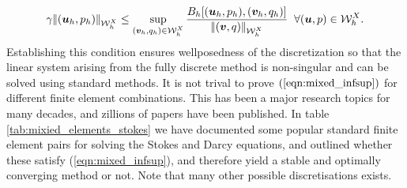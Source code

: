 \begin{equation}
  \gamma {\left\vert\kern-0.25ex\left\vert (\boldsymbol{u}_{h},p_{h}) \right\vert\kern-0.25ex\right\vert}_{\mathcal{W}^{X}_{h}} \leq \sup_{(\boldsymbol{v}_{h},q_{h})\in \mathcal{W}^{X}_{h}}\frac{B_{h}[(\boldsymbol{u}_{h},p_{h}),(\boldsymbol{v}_{h},q_{h})]}{{\left\vert\kern-0.25ex\left\vert (\boldsymbol{v},q) \right\vert\kern-0.25ex\right\vert}_{\mathcal{W}^{X}_{h}}} \;\; \forall (\boldsymbol{u},p) \in \mathcal{W}^{X}_{h}.
\label{eqn:mixed_infsup}
\end{equation}
Establishing this condition ensures wellposedness of the discretization so that the linear system arising from the fully discrete method is non-singular and can be solved using standard methods. It is not trival to prove $(\ref{eqn:mixed_infsup})$ for different finite element combinations. This has been a major research topics for many decades, and zillions of papers have been published. In table \ref{tab:mixied_elements_stokes} we have documented some popular standard finite element pairs for solving the Stokes and Darcy equations, and outlined whether these satisfy (\ref{eqn:mixed_infsup}), and therefore yield a stable and optimally converging method or not. Note that many other possible discretisations exists.
\begin{comment}
\begin{table}[h]
\begin{center}
\scalebox{0.9}{
\begin{tabular}{ l c c c}
\hline Mixed element &Stokes&Darcy & Reference \\
\hline
P1-P1   & \xmark & \xmark & \citet{burman2007unified}\\
P2-P1 & \cmark& \xmark & \citet{brezzi1991mixed,burman2007unified}\\
P1-P1+stab & \cmark& \cmark&\citet{bochev2006computational}\\
P1-P0 & \xmark& \xmark&\citet{burman2007unified}\\
RT-P0 & \xmark& \cmark&\cite{raviart1977mixed}\\
P1-P0+stab  & \cmark& \cmark& \citet{burman2007unified}\\
\hline
\end{tabular}
}
\end{center}
\caption{Possible finite element combinations for Stokes and Darcy flow, showing whether a particular choice of elements is stable and optimally converging or not.} \label{tab:mixied_elements_stokes}
\end{table}
\end{comment}
%
